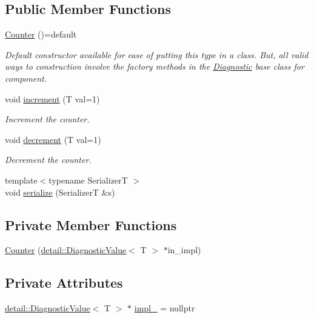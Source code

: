 \subsection*{Public Member Functions}
\begin{DoxyCompactItemize}
\item 
\hyperlink{structvt_1_1runtime_1_1component_1_1meter_1_1_counter_afbe8191f66fc515812ee5bf1b5d857a8}{Counter} ()=default
\begin{DoxyCompactList}\small\item\em Default constructor available for ease of putting this type in a class. But, all valid ways to construction involve the factory methods in the {\ttfamily \hyperlink{structvt_1_1runtime_1_1component_1_1_diagnostic}{Diagnostic}} base class for component. \end{DoxyCompactList}\item 
void \hyperlink{structvt_1_1runtime_1_1component_1_1meter_1_1_counter_a5bd034dd4cc31c824242ac92e6cdeaee}{increment} (T val=1)
\begin{DoxyCompactList}\small\item\em Increment the counter. \end{DoxyCompactList}\item 
void \hyperlink{structvt_1_1runtime_1_1component_1_1meter_1_1_counter_a020d52d2540855c661003bb50265e7db}{decrement} (T val=1)
\begin{DoxyCompactList}\small\item\em Decrement the counter. \end{DoxyCompactList}\item 
{\footnotesize template$<$typename SerializerT $>$ }\\void \hyperlink{structvt_1_1runtime_1_1component_1_1meter_1_1_counter_a4eddbf849464269e14c11baaea206df2}{serialize} (SerializerT \&s)
\end{DoxyCompactItemize}
\subsection*{Private Member Functions}
\begin{DoxyCompactItemize}
\item 
\hyperlink{structvt_1_1runtime_1_1component_1_1meter_1_1_counter_a649a29b69ce8db44fa9643820cd75080}{Counter} (\hyperlink{structvt_1_1runtime_1_1component_1_1detail_1_1_diagnostic_value}{detail\+::\+Diagnostic\+Value}$<$ T $>$ $\ast$in\+\_\+impl)
\end{DoxyCompactItemize}
\subsection*{Private Attributes}
\begin{DoxyCompactItemize}
\item 
\hyperlink{structvt_1_1runtime_1_1component_1_1detail_1_1_diagnostic_value}{detail\+::\+Diagnostic\+Value}$<$ T $>$ $\ast$ \hyperlink{structvt_1_1runtime_1_1component_1_1meter_1_1_counter_a2e2b0b2a78c95c3017a571bd76310eba}{impl\+\_\+} = nullptr
\end{DoxyCompactItemize}
